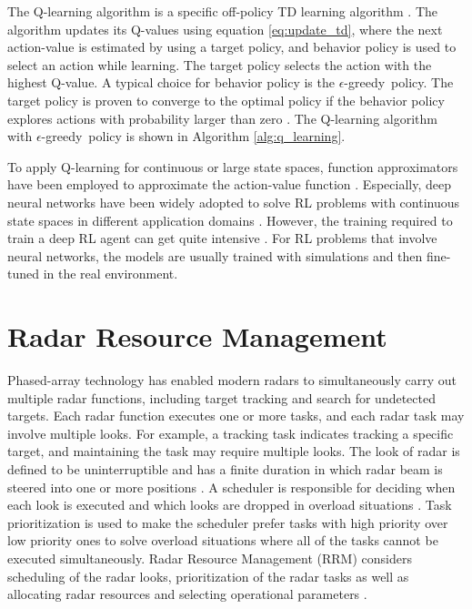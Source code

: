 \documentclass[english, 12pt, a4paper, elec, utf8, a-1b, online]{aaltothesis}
\numberwithin{equation}{section}
\newcommand{\egreedy}{$\epsilon$-greedy~}
\begin{document}
The Q-learning algorithm is a specific off-policy TD learning algorithm \cite{Sutton2018}.
The algorithm updates its Q-values using equation \eqref{eq:update_td}, where the next action-value is estimated by using a target policy, 
and behavior policy is used to select an action while learning. 
The target policy selects the action with the highest Q-value.
A typical choice for behavior policy is the \egreedy policy. 
The target policy is proven to converge to the optimal policy if the behavior policy explores actions with probability larger than zero \cite{Sutton2018}.
The Q-learning algorithm with \egreedy policy is shown in Algorithm \ref{alg:q_learning}.

To apply Q-learning for continuous or large state spaces, function approximators have been employed to approximate the action-value function \cite{Sutton2018}. 
Especially, deep neural networks have been widely adopted to solve RL problems with continuous state spaces in different application domains \cite{Mnih2013, Zhang2018, Luong2018}.
However, the training required to train a deep RL agent can get quite intensive \cite{Mnih2013}.
For RL problems that involve neural networks, the models are usually trained with simulations and then fine-tuned in the real environment.


\clearpage
\section{Radar Resource Management} \label{sec:existing_RRM}


Phased-array technology has enabled modern radars to simultaneously carry out multiple radar functions, including target tracking and search for undetected targets.
Each radar function executes one or more tasks, and each radar task may involve multiple looks.
For example, a tracking task indicates tracking a specific target, and maintaining the task may require multiple looks.
The look of radar is defined to be uninterruptible and has a finite duration in which radar beam is steered into one or more positions \cite{Moo2016}.
A scheduler is responsible for deciding when each look is executed and which looks are dropped in overload situations \cite{Moo2016}. 
Task prioritization is used to make the scheduler prefer tasks with high priority over low priority ones to solve overload situations where all of the tasks cannot be executed simultaneously.
Radar Resource Management (RRM) considers scheduling of the radar looks, prioritization of the radar tasks as well as allocating radar resources and selecting operational parameters \cite{Moo2016}. 
\end{document}
